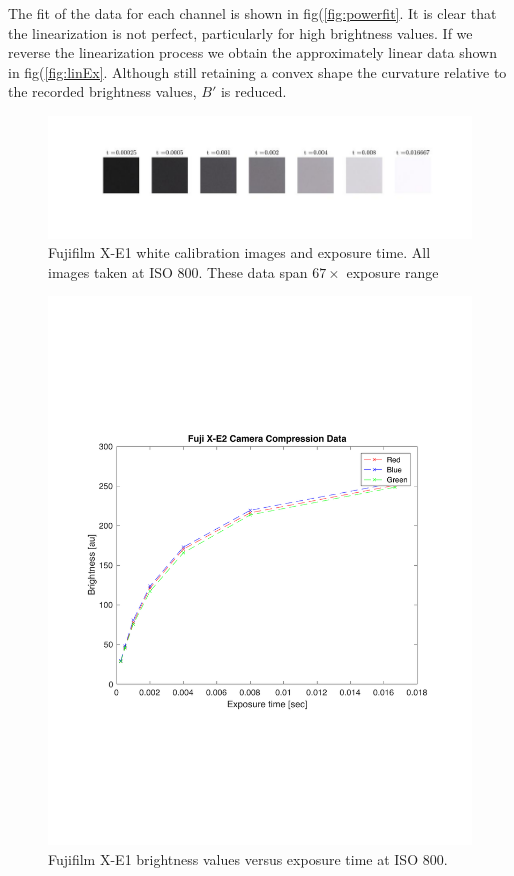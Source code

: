 \documentclass[a4paper]{article}
\begin{document}
The fit of the data for each channel is shown in fig(\ref{fig:powerfit}.  It is clear that the linearization is not perfect, particularly for high brightness values. If we reverse the linearization process we obtain the approximately linear data shown in fig(\ref{fig:linEx}.  Although still retaining a convex shape the curvature relative to the recorded brightness values, $B'$ is reduced. 
\begin{figure}[htb!]
    \begin{center}
        \includegraphics[width=\textwidth]{white_fuji.jpg}
	 \end{center}
    \caption{Fujifilm X-E1 white calibration images and exposure time. All images taken at ISO 800. These data span $67 \times$ exposure range} 
    \label{fig:white}
\end{figure}

\begin{figure}[htb!]
    \begin{center}
        \includegraphics[width=6 in]{Ecal.pdf}
	 \end{center}
    \caption{Fujifilm X-E1 brightness values versus exposure time at ISO 800.} 
    \label{fig:Ecal}
\end{figure}
\end{document}
